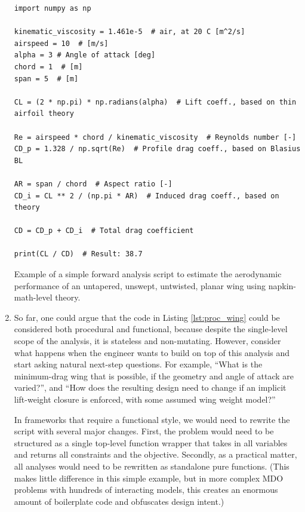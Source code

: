 \begin{enumerate}
    \begin{listing}[H]
        \begin{verbatim}
import numpy as np

kinematic_viscosity = 1.461e-5  # air, at 20 C [m^2/s]
airspeed = 10  # [m/s]
alpha = 3 # Angle of attack [deg]
chord = 1  # [m]
span = 5  # [m]

CL = (2 * np.pi) * np.radians(alpha)  # Lift coeff., based on thin airfoil theory

Re = airspeed * chord / kinematic_viscosity  # Reynolds number [-]
CD_p = 1.328 / np.sqrt(Re)  # Profile drag coeff., based on Blasius BL

AR = span / chord  # Aspect ratio [-]
CD_i = CL ** 2 / (np.pi * AR)  # Induced drag coeff., based on theory

CD = CD_p + CD_i  # Total drag coefficient

print(CL / CD)  # Result: 38.7
        \end{verbatim}
        \caption{Example of a simple forward analysis script to estimate the aerodynamic performance of an untapered, unswept, untwisted, planar wing using napkin-math-level theory.}
        \label{lst:proc_wing}
    \end{listing}

    \item So far, one could argue that the code in Listing \ref{lst:proc_wing} could be considered both procedural and functional, because despite the single-level scope of the analysis, it is stateless and non-mutating. However, consider what happens when the engineer wants to build on top of this analysis and start asking natural next-step questions. For example, ``What is the minimum-drag wing that is possible, if the geometry and angle of attack are varied?'', and ``How does the resulting design need to change if an implicit lift-weight closure is enforced, with some assumed wing weight model?''

    In frameworks that require a functional style, we would need to rewrite the script with several major changes. First, the problem would need to be structured as a single top-level function wrapper that takes in all variables and returns all constraints and the objective. Secondly, as a practical matter, all analyses would need to be rewritten as standalone pure functions. (This makes little difference in this simple example, but in more complex MDO problems with hundreds of interacting models, this creates an enormous amount of boilerplate code and obfuscates design intent.)


\end{enumerate}
